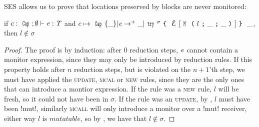 
SES allows us to prove that locations preserved by \Q@try@ blocks are never monitored:
\begin{Lemma}\rm
	if $c:\Kw{Cap};\emptyset\vdash \e: \T$ and $c\mapsto\Kw{Cap}\{\_\}|\e\rightarrow^+ \_|\Kw{try}^\sigma\oC\ctx[\M{l}{\_}{\_}]\cC\ \_$, then $l\notin\sigma$
\end{Lemma}
\begin{proof}
The proof is by induction: after 0 reduction steps, ${\mathit{e}}$ cannot contain a monitor expression, since they may only be introduced by reduction rules. If this property holds after $n$ reduction steps, but is violated on the $n+1$'th step, we must have applied the \textsc{update}, \textsc{mcal} or \textsc{new} rules, since they are the only ones that can introduce a montior expression. If the rule was a \textsc{new} rule, $l$ will be fresh, so it could not have been in $\sigma$. If the rule was an \textsc{update}, by , $l$ must have been \Q!mut!, similarly \textsc{mcall} will only introduce a monitor over a \Q!mut! receiver, either way $l$ is $\mathit{mutatable}$, so by , we have that $l \notin \sigma$.
\end{proof}




